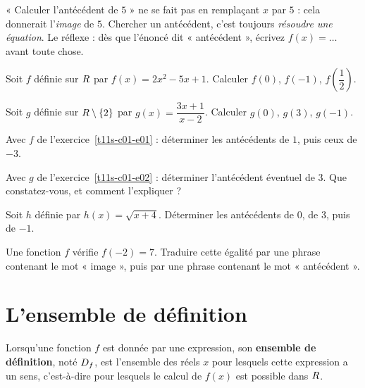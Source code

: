 \begin{erreurclassique}
« Calculer l'antécédent de $5$ » ne se fait pas en remplaçant $x$ par $5$ :
cela donnerait l'\emph{image} de $5$. Chercher un antécédent, c'est toujours
\emph{résoudre une équation}. Le réflexe : dès que l'énoncé dit
« antécédent », écrivez $f(x) = \ldots$ avant toute chose.
\end{erreurclassique}

\begin{entrainement}
\exo\label{t11s-c01-e01} Soit $f$ définie sur $R$ par $f(x) = 2x^{2} - 5x + 1$. Calculer
$f(0)$, $f(-1)$, $f\!\left(\dfrac{1}{2}\right)$.

\exo\label{t11s-c01-e02} Soit $g$ définie sur $R \setminus \{2\}$ par
$g(x) = \dfrac{3x+1}{x-2}$. Calculer $g(0)$, $g(3)$, $g(-1)$.

\exo\label{t11s-c01-e03} Avec $f$ de l’exercice~\ref{t11s-c01-e01} : déterminer les antécédents de $1$, puis
ceux de $-3$.

\exo\label{t11s-c01-e04} Avec $g$ de l’exercice~\ref{t11s-c01-e02} : déterminer l'antécédent éventuel de $3$.
Que constatez-vous, et comment l'expliquer ?

\exo\label{t11s-c01-e05} Soit $h$ définie par $h(x) = \sqrt{x+4}$. Déterminer les antécédents
de $0$, de $3$, puis de $-1$.

\exo\label{t11s-c01-e06} Une fonction $f$ vérifie $f(-2) = 7$. Traduire cette égalité par une
phrase contenant le mot « image », puis par une phrase contenant le mot
« antécédent ».
\end{entrainement}

\section{L'ensemble de définition}

\begin{definition}
Lorsqu'une fonction $f$ est donnée par une expression, son \textbf{ensemble de
définition}, noté $D_{f}$, est l'ensemble des réels $x$ pour lesquels cette
expression a un sens, c'est-à-dire pour lesquels le calcul de $f(x)$ est
possible dans $R$.
\end{definition}

